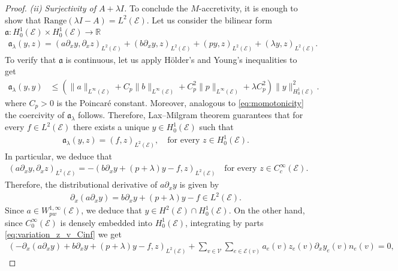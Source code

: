 \documentclass[10pt,a4paper]{amsart}
\def\R{\mathbb R}
\def\to{\rightarrow}
\begin{document}
\begin{proof}
\smallbreak
\textit{(ii) Surjectivity of  $A+\lambda I$.} To conclude the $M$-accretivity, it is enough to show that
$\text{Range}(\lambda I - A) = L^2(\mathcal{E})$. Let us consider the bilinear form $\mathfrak{a}:H_0^1(\mathcal{E})\times H_0^1(\mathcal{E})\to \R$
    \begin{align*}
        \mathfrak{a}_\lambda(y,z)= (a\partial_x y, \partial_x z)_{L^2(\mathcal{E})} +(b\partial_x y,z)_{L^2(\mathcal{E})} + (py,z)_{L^2(\mathcal{E})}+(\lambda y,z)_{L^2(\mathcal{E})}.
    \end{align*}
To verify that $\mathfrak{a}$ is continuous, let us apply Hölder’s and Young’s inequalities to get
\begin{align}\label{eq:dissip2}
   \mathfrak{a}_\lambda (y,y)&\leq\left( \|a\|_{L^\infty(\mathcal{E})} +C_p\|b\|_{L^\infty(\mathcal{E})} +C_p^2\|p\|_{L^\infty(\mathcal{E})} +\lambda C_p^2 \right) \| y \|_{H^1_0(\mathcal{E})}^2.
\end{align}
where $C_p>0$ is the Poincaré constant. Moreover, analogous to \eqref{eq:momotonicity} the coercivity of $\mathfrak{a}_\lambda$ follows. Therefore, Lax--Milgram theorem guarantees that for every $f\in L^2(\mathcal{E}) $ there exists a unique 
$y\in H_0^1(\mathcal{E})$ such that
\begin{align*}
\mathfrak{a}_\lambda(y,z)
=
(f,z)_{L^2(\mathcal{E})},
\quad \text{for every }
z\in H_0^1(\mathcal{E}).
\end{align*}
In particular, we deduce that  
\begin{align}\label{eq:variation_z_v_Cinf}
    (a\partial_x y,\partial_x z)_{L^2(\mathcal{E})}= -( b\partial_x y +(p+\lambda)y -f,z)_{L^2(\mathcal{E})} \quad \text{for every }z\in C^\infty_{c}(\mathcal{E}).
\end{align}
Therefore, the distributional derivative of $a\partial_x y$ is given by 
\begin{align}\label{eq:distriv_deriv_y}
    \partial_x(a\partial_x y) = b\partial_x y +(p+\lambda)y -f\in L^2(\mathcal{E}).
\end{align}
Since $a\in W^{1,\infty}_{pw}(\mathcal{E})$, we deduce that $y\in H^2(\mathcal{E})\cap H_0^1(\mathcal{E})$. On the other hand, since $C^\infty_0(\mathcal{E})$ is densely embedded into $H^1_{0}(\mathcal{E})$, integrating by parts \eqref{eq:variation_z_v_Cinf} we get
\begin{align}\label{eq:des_var_Cinf}
    (-\partial_x(a\partial_x y) + b\partial_x y +(p+\lambda)y -f,z)_{L^2(\mathcal{E})}+\sum_{v\in \mathcal{V}}\sum_{e\in\mathcal{E}(v)}a_e(v)z_e(v)\partial_x y_e(v)n_e(v)=0,

\end{align}
\end{proof}
\end{document}
